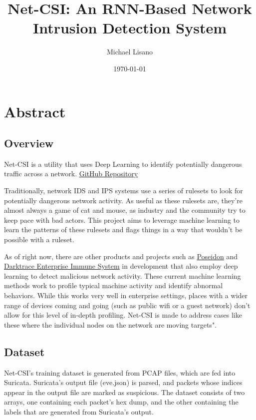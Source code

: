 \documentclass{article}
\title{Net-CSI: An RNN-Based Network Intrusion Detection System}
\author{Michael Lisano}
\date{\today}
\begin{document}
\graphicspath{ {../assets/logo.png} }
\maketitle

\section*{Abstract}

\subsection*{Overview}

Net-CSI is a utility that uses Deep Learning to identify potentially dangerous traffic across a network. \href{https://github.com/turtlebasket/net-csi}{GitHub Repository}

Traditionally, network IDS and IPS systems use a series of rulesets to look for potentially dangerous network activity. As useful as these rulesets are, they're almost always a game of cat and mouse, as industry and the community try to keep pace with bad actors. This project aims to leverage machine learning to learn the patterns of these rulesets and flags things in a way that wouldn't be possible with a ruleset.

As of right now, there are other products and projects such as \href{https://github.com/CyberReboot/poseidon}{Poseidon} and \href{https://www.darktrace.com/en/products/enterprise/}{Darktrace Enterprise Immune System} in development that also employ deep learning to detect malicious network activity. These current machine learning methods work to profile typical machine activity and identify abnormal behaviors. While this works very well in enterprise settings, places with a wider range of devices coming and going (such as public wifi or a guest network) don't allow for this level of in-depth profiling. Net-CSI is made to address cases like these where the individual nodes on the network are moving targets".

\subsection*{Dataset}
Net-CSI's training dataset is generated from PCAP files, which are fed into Suricata. Suricata's output file (eve.json) is parsed, and packets whose indices appear in the output file are marked as suspicious. The dataset consists of two arrays, one containing each packet's hex dump, and the other containing the labels that are generated from Suricata's output.
\end{document}
